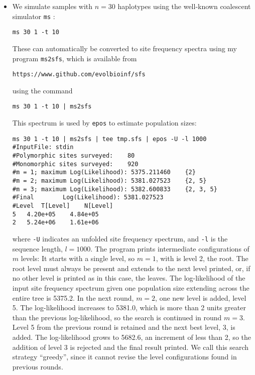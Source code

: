 \documentclass[a4paper]{article}
\newcommand{\ty}{\texttt}
\begin{document}
\begin{itemize}
\item We simulate samples with
  $n=30$ haplotypes using the well-known coalescent simulator \ty{ms} \citep{hud02:gen}:
\begin{verbatim}
ms 30 1 -t 10 
\end{verbatim}
These can automatically be converted to site frequency spectra using
my program \ty{ms2sfs}, which is available from
\begin{verbatim}
https://www.github.com/evolbioinf/sfs
\end{verbatim}
using the command
\begin{verbatim}
ms 30 1 -t 10 | ms2sfs
\end{verbatim}
This spectrum is used by \ty{epos} to estimate population
sizes:
\begin{verbatim}
ms 30 1 -t 10 | ms2sfs | tee tmp.sfs | epos -U -l 1000
#InputFile:	stdin
#Polymorphic sites surveyed:	80
#Monomorphic sites surveyed:	920
#m = 1; maximum Log(Likelihood): 5375.211460	{2}
#m = 2; maximum Log(Likelihood): 5381.027523	{2, 5}
#m = 3; maximum Log(Likelihood): 5382.600833	{2, 3, 5}
#Final        Log(Likelihood): 5381.027523
#Level	T[Level]	N[Level]
5	4.20e+05	4.84e+05
2	5.24e+06	1.61e+06
\end{verbatim}
where \ty{-U} indicates an unfolded site frequency spectrum, and
\ty{-l} is the sequence length, $l=1000$. The program prints
intermediate configurations of $m$ levels: It starts with a single
level, so $m=1$, with is level 2, the root. The root level must always
be present and extends to the next level printed, or, if no other
level is printed as in this case, the leaves. The log-likelihood of
the input site frequency spectrum given one population size extending
across the entire tree is 5375.2. In the next round, $m=2$, one new
level is added, level 5. The log-likelihood increases to 5381.0, which
is more than 2 units greater than the previous log-likelihood, so the
search is continued in round $m=3$. Level 5 from the previous round is
retained and the next best level, 3, is added. The log-likelihood
grows to 5682.6, an increment of less than 2, so the addition of level
3 is rejected and the final result printed. We call this search
strategy ``greedy'', since it cannot revise the level configurations
found in previous rounds.


\end{itemize}
\end{document}
